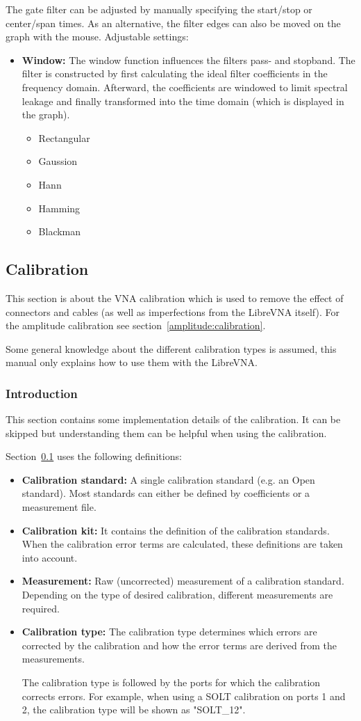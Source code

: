 \documentclass[a4paper,11pt]{article}
\newcommand{\vna}{LibreVNA}
\begin{document}
The gate filter can be adjusted by manually specifying the start/stop or center/span times. As an alternative, the filter edges can also be moved on the graph with the mouse.
Adjustable settings:
\begin{itemize}
\item \textbf{Window:} The window function influences the filters pass- and stopband. The filter is constructed by first calculating the ideal filter coefficients in the frequency domain. Afterward, the coefficients are windowed to limit spectral leakage and finally transformed into the time domain (which is displayed in the graph).
\begin{itemize}
\item Rectangular
\item Gaussion
\item Hann
\item Hamming
\item Blackman
\end{itemize}
\end{itemize}

\subsection{Calibration}
\label{vna:calibration}
This section is about the VNA calibration which is used to remove the effect of connectors and cables (as well as imperfections from the \vna{} itself). For the amplitude calibration see section~\ref{amplitude:calibration}.

Some general knowledge about the different calibration types is assumed, this manual only explains how to use them with the \vna{}.
\subsubsection{Introduction}
This section contains some implementation details of the calibration. It can be skipped but understanding them can be helpful when using the calibration.

Section~\ref{vna:calibration} uses the following definitions:
\begin{itemize}
\item \textbf{Calibration standard:} A single calibration standard (e.g. an Open standard). Most standards can either be defined by coefficients or a measurement file.
\item \textbf{Calibration kit:} It contains the definition of the calibration standards. When the calibration error terms are calculated, these definitions are taken into account.
\item \textbf{Measurement:} Raw (uncorrected) measurement of a calibration standard. Depending on the type of desired calibration, different measurements are required.
\item \textbf{Calibration type:} The calibration type determines which errors are corrected by the calibration and how the error terms are derived from the measurements.

The calibration type is followed by the ports for which the calibration corrects errors. For example, when using a SOLT calibration on ports 1 and 2, the calibration type will be shown as "SOLT\_12".
\end{itemize}
\end{document}

